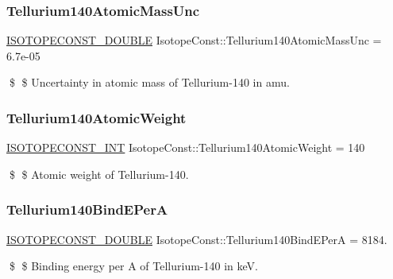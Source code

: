 \subsubsection{\texorpdfstring{Tellurium140\+Atomic\+Mass\+Unc}{Tellurium140AtomicMassUnc}}
{\footnotesize\ttfamily \mbox{\hyperlink{group___isotope_const-_macros_ga8f45a7272ce02c0b4c65c44636ed719a}{I\+S\+O\+T\+O\+P\+E\+C\+O\+N\+S\+T\+\_\+\+D\+O\+U\+B\+LE}} Isotope\+Const\+::\+Tellurium140\+Atomic\+Mass\+Unc = 6.\+7e-\/05}

\$ \$ Uncertainty in atomic mass of Tellurium-\/140 in amu. \mbox{\label{group___isotope_const-_tellurium-_te140_gae58f531c6acbd3aa5fd51b3136069e12}} 
\subsubsection{\texorpdfstring{Tellurium140\+Atomic\+Weight}{Tellurium140AtomicWeight}}
{\footnotesize\ttfamily \mbox{\hyperlink{group___isotope_const-_macros_ga5f18360b3e99483a35c32d789e62621c}{I\+S\+O\+T\+O\+P\+E\+C\+O\+N\+S\+T\+\_\+\+I\+NT}} Isotope\+Const\+::\+Tellurium140\+Atomic\+Weight = 140}

\$ \$ Atomic weight of Tellurium-\/140. \mbox{\label{group___isotope_const-_tellurium-_te140_ga0316dc34445710b7007468e403221587}} 
\subsubsection{\texorpdfstring{Tellurium140\+Bind\+E\+PerA}{Tellurium140BindEPerA}}
{\footnotesize\ttfamily \mbox{\hyperlink{group___isotope_const-_macros_ga8f45a7272ce02c0b4c65c44636ed719a}{I\+S\+O\+T\+O\+P\+E\+C\+O\+N\+S\+T\+\_\+\+D\+O\+U\+B\+LE}} Isotope\+Const\+::\+Tellurium140\+Bind\+E\+PerA = 8184.}

\$ \$ Binding energy per A of Tellurium-\/140 in keV. \mbox{\label{group___isotope_const-_tellurium-_te140_ga06bc15d7ffba75038da453f421491f51}} 
